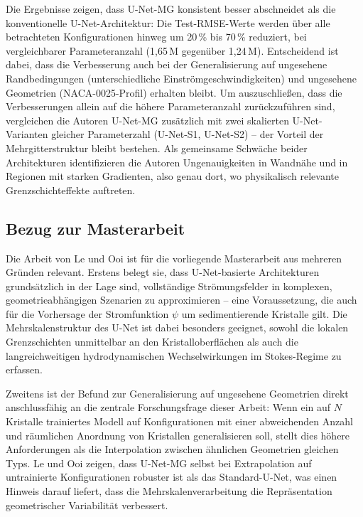 \documentclass[a4paper,12pt]{article}
\begin{document}
Die Ergebnisse zeigen, dass U-Net-MG konsistent besser abschneidet als die
konventionelle U-Net-Architektur: Die Test-RMSE-Werte werden über alle betrachteten
Konfigurationen hinweg um 20\,\% bis 70\,\% reduziert, bei vergleichbarer Parameteranzahl
(1,65\,M gegenüber 1,24\,M). Entscheidend ist dabei, dass die Verbesserung auch bei der
Generalisierung auf ungesehene Randbedingungen (unterschiedliche Einströmgeschwindigkeiten) und ungesehene Geometrien (NACA-0025-Profil) erhalten bleibt. Um
auszuschließen, dass die Verbesserungen allein auf die höhere Parameteranzahl zurückzuführen sind, vergleichen die Autoren U-Net-MG zusätzlich mit zwei skalierten
U-Net-Varianten gleicher Parameterzahl (U-Net-S1, U-Net-S2) -- der Vorteil der
Mehrgitterstruktur bleibt bestehen. Als gemeinsame Schwäche beider Architekturen
identifizieren die Autoren Ungenauigkeiten in Wandnähe und in Regionen mit starken
Gradienten, also genau dort, wo physikalisch relevante Grenzschichteffekte auftreten.

\subsection*{Bezug zur Masterarbeit}

Die Arbeit von Le und Ooi ist für die vorliegende Masterarbeit aus mehreren Gründen
relevant. Erstens belegt sie, dass U-Net-basierte Architekturen grundsätzlich in der Lage
sind, vollständige Strömungsfelder in komplexen, geometrieabhängigen Szenarien zu
approximieren -- eine Voraussetzung, die auch für die Vorhersage der Stromfunktion
$\psi$ um sedimentierende Kristalle gilt. Die Mehrskalenstruktur des U-Net ist dabei
besonders geeignet, sowohl die lokalen Grenzschichten unmittelbar an den
Kristalloberflächen als auch die langreichweitigen hydrodynamischen Wechselwirkungen
im Stokes-Regime zu erfassen.

Zweitens ist der Befund zur Generalisierung auf ungesehene Geometrien direkt
anschlussfähig an die zentrale Forschungsfrage dieser Arbeit: Wenn ein auf $N$ Kristalle
trainiertes Modell auf Konfigurationen mit einer abweichenden Anzahl und räumlichen
Anordnung von Kristallen generalisieren soll, stellt dies höhere Anforderungen als die
Interpolation zwischen ähnlichen Geometrien gleichen Typs. Le und Ooi zeigen, dass
U-Net-MG selbst bei Extrapolation auf untrainierte Konfigurationen robuster ist als das
Standard-U-Net, was einen Hinweis darauf liefert, dass die Mehrskalenverarbeitung die
Repräsentation geometrischer Variabilität verbessert.
\end{document}
